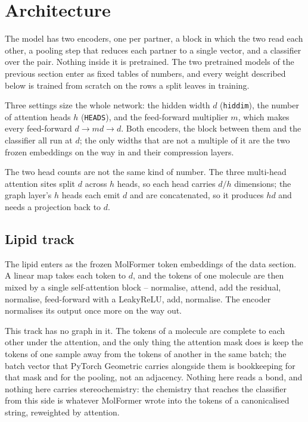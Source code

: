 \section{Architecture}

The model has two encoders, one per partner, a block in which the two read each other, a
pooling step that reduces each partner to a single vector, and a classifier over the
pair. Nothing inside it is pretrained. The two pretrained models of the previous section
enter as fixed tables of numbers, and every weight described below is trained from
scratch on the rows a split leaves in training.

Three settings size the whole network: the hidden width $d$ (\texttt{hiddim}), the number
of attention heads $h$ (\texttt{HEADS}), and the feed-forward multiplier $m$, which makes
every feed-forward $d \to m d \to d$. Both encoders, the block between them and the
classifier all run at $d$; the only widths that are not a multiple of it are the two frozen
embeddings on the way in and their compression layers.

The two head counts are not the same kind of number. The three multi-head attention sites
split $d$ across $h$ heads, so each head carries $d / h$ dimensions; the graph layer's $h$
heads each emit $d$ and are concatenated, so it produces $hd$ and needs a projection back
to $d$.

\subsection{Lipid track}

The lipid enters as the frozen MolFormer token embeddings of the data section. A linear
map takes each token to $d$, and the tokens of one molecule are then mixed by a single
self-attention block -- normalise, attend, add the residual, normalise, feed-forward with
a LeakyReLU, add, normalise. The encoder normalises its output once more on the way out.

This track has no graph in it. The tokens of a molecule are complete to each other under
the attention, and the only thing the attention mask does is keep the tokens of one
sample away from the tokens of another in the same batch; the batch vector that PyTorch
Geometric carries alongside them is bookkeeping for that mask and for the pooling, not an
adjacency. Nothing here reads a bond, and nothing here carries stereochemistry: the
chemistry that reaches the classifier from this side is whatever MolFormer wrote into the
tokens of a canonicalised string, reweighted by attention.

